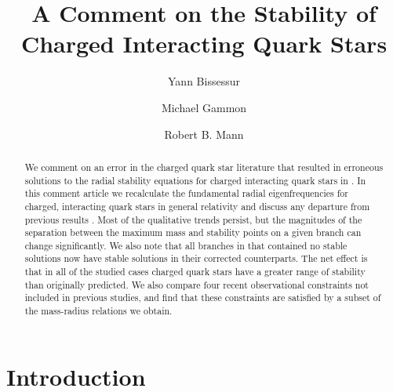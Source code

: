 \documentclass[12pt,noshowpacs,nofootinbib,notitlepage,amsmath,superscriptaddress]{revtex4-1}%
\begin{document}
\title{A Comment on the Stability of Charged Interacting Quark Stars}
\author{Yann Bissessur}
\author{Michael Gammon}
\author{Robert B. Mann}



\begin{abstract}
We comment on an error in the charged quark star literature \cite{Goncalves:2020joq} that resulted in erroneous solutions to the radial stability equations for charged interacting quark stars in \cite{zhang:2021}.  In this comment article we recalculate the fundamental radial eigenfrequencies for charged, interacting quark stars in general relativity and discuss any departure from previous results  \cite{zhang:2021}. Most of the qualitative trends persist, but the magnitudes of the separation between the maximum mass and stability points on a given branch can change significantly. We also note that all branches in \cite{zhang:2021} that contained no stable solutions now have stable solutions in their corrected counterparts. The net effect is that in  all of the studied cases charged quark stars have a greater range of stability than originally  predicted. We   also compare four recent observational constraints 
not included in previous studies, and find that these constraints are satisfied by a subset of the mass-radius relations we obtain.

\end{abstract}
\maketitle
\newpage

\section{Introduction}\label{sec:intro}
\end{document}
